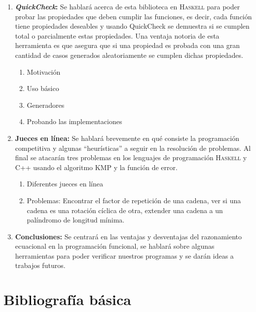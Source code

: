 \documentclass[letterpaper,11pt]{article}
\begin{document}
\begin{enumerate}
\item \textbf{\textit{QuickCheck}:} Se hablará acerca de esta biblioteca en \textsc{Haskell} para
poder probar las propiedades que deben cumplir las funciones, es decir, cada función tiene
propiedades deseables y usando QuickCheck se demuestra si se cumplen total o parcialmente
estas propiedades. Una ventaja notoria de esta herramienta es que asegura que si una propiedad 
es probada con una gran cantidad de casos generados aleatoriamente se cumplen dichas propiedades.
\begin{enumerate}
    \item Motivación
    \item Uso básico
    \item Generadores
    \item Probando las implementaciones
\end{enumerate}

\item \textbf{Jueces en línea:} Se hablará brevemente en qué consiste la programación competitiva
y algunas ``heurísticas'' a seguir en la resolución de problemas. Al final se atacarán tres
problemas en los lenguajes de programación \textsc{Haskell} y \textsc{C++} usando el algoritmo
KMP y la función de error.
\begin{enumerate}
    \item Diferentes jueces en línea
    \item Problemas: Encontrar el factor de repetición de una cadena, ver si una cadena es una
    rotación cíclica de otra, extender una cadena a un palíndromo de longitud mínima.
\end{enumerate}

\item \textbf{Conclusiones:} Se centrará en las ventajas y desventajas del razonamiento
ecuacional en la programación funcional, se hablará sobre algunas herramientas para poder
verificar nuestros programas y se darán ideas a trabajos futuros.

\end{enumerate}

\section{Bibliografía básica}
\end{document}
